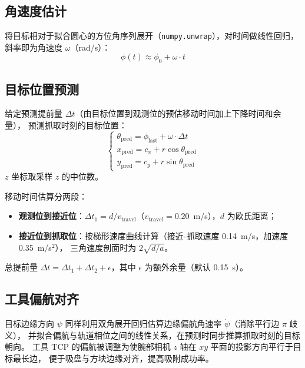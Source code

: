 \documentclass[12pt,a4paper]{article}
\begin{document}
\subsection{角速度估计}

将目标相对于拟合圆心的方位角序列展开（\texttt{numpy.unwrap}），对时间做线性回归，
斜率即为角速度 $\omega$（rad/s）：
\begin{equation}
  \phi(t) \approx \phi_0 + \omega \cdot t
  \label{eq:omega}
\end{equation}

\subsection{目标位置预测}

给定预测提前量 $\Delta t$（由目标位置到观测位的预估移动时间加上下降时间和余量），
预测抓取时刻的目标位置：
\begin{equation}
  \begin{cases}
    \theta_\mathrm{pred} = \phi_\mathrm{last} + \omega \cdot \Delta t \\
    x_\mathrm{pred} = c_x + r\cos\theta_\mathrm{pred} \\
    y_\mathrm{pred} = c_y + r\sin\theta_\mathrm{pred}
  \end{cases}
  \label{eq:predict}
\end{equation}
$z$ 坐标取采样 $z$ 的中位数。

移动时间估算分两段：
\begin{itemize}[noitemsep]
  \item \textbf{观测位到接近位}：$\Delta t_1 = d / v_\mathrm{travel}$（$v_\mathrm{travel} = 0.20$~m/s），$d$ 为欧氏距离；
  \item \textbf{接近位到抓取位}：按梯形速度曲线计算（接近-抓取速度 0.14~m/s，加速度 0.35~m/s$^2$），
        三角速度剖面时为 $2\sqrt{d/a}$。
\end{itemize}
总提前量 $\Delta t = \Delta t_1 + \Delta t_2 + \epsilon$，其中 $\epsilon$ 为额外余量（默认 0.15~s）。

\subsection{工具偏航对齐}

目标边缘方向 $\psi$ 同样利用双角展开回归估算边缘偏航角速率 $\dot\psi$（消除平行边 $\pi$ 歧义），
并拟合偏航与轨道相位之间的线性关系，在预测时同步推算抓取时刻的目标朝向。
工具 TCP 的偏航被调整为使腕部相机 $z$ 轴在 $xy$ 平面的投影方向平行于目标最长边，
便于吸盘与方块边缘对齐，提高吸附成功率。
\end{document}
